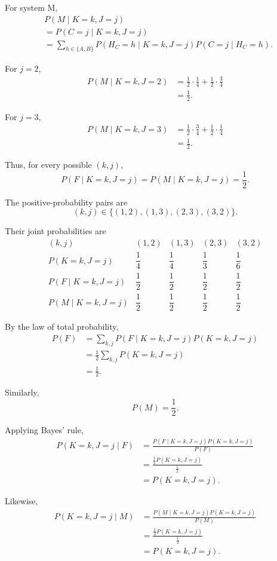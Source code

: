 \documentclass[11pt,a4paper]{article}
\newcommand{\Prob}{P}
\begin{document}
For system M,
\[
\begin{aligned}
&\Prob(M\mid K=k,J=j)\\
&=\Prob(C=j\mid K=k,J=j)\\
&=\sum_{h\in\{A,B\}}
\Prob(H_C=h\mid K=k,J=j)
\Prob(C=j\mid H_C=h).
\end{aligned}
\]

For $j=2$,
\[
\begin{aligned}
\Prob(M\mid K=k,J=2)
&=\frac12\cdot\frac14+
\frac12\cdot\frac34\\
&=\frac12.
\end{aligned}
\]

For $j=3$,
\[
\begin{aligned}
\Prob(M\mid K=k,J=3)
&=\frac12\cdot\frac34+
\frac12\cdot\frac14\\
&=\frac12.
\end{aligned}
\]

Thus, for every possible $(k,j)$,
\[
\Prob(F\mid K=k,J=j)
=
\Prob(M\mid K=k,J=j)
=
\frac12.
\]

The positive-probability pairs are
\[
(k,j)\in\{(1,2),(1,3),(2,3),(3,2)\}.
\]

Their joint probabilities are
\[
\begin{array}{c|cccc}
(k,j)&(1,2)&(1,3)&(2,3)&(3,2)\\
\hline
\Prob(K=k,J=j)
&\dfrac14&\dfrac14&\dfrac13&\dfrac16\\[6pt]
\Prob(F\mid K=k,J=j)
&\dfrac12&\dfrac12&\dfrac12&\dfrac12\\[6pt]
\Prob(M\mid K=k,J=j)
&\dfrac12&\dfrac12&\dfrac12&\dfrac12
\end{array}
\]

By the law of total probability,
\[
\begin{aligned}
\Prob(F)
&=\sum_{k,j}
\Prob(F\mid K=k,J=j)\Prob(K=k,J=j)\\
&=\frac12\sum_{k,j}\Prob(K=k,J=j)\\
&=\frac12.
\end{aligned}
\]

Similarly,
\[
\Prob(M)=\frac12.
\]

Applying Bayes' rule,
\[
\begin{aligned}
\Prob(K=k,J=j\mid F)
&=\frac{\Prob(F\mid K=k,J=j)
\Prob(K=k,J=j)}{\Prob(F)}\\
&=\frac{\frac12\Prob(K=k,J=j)}{\frac12}\\
&=\Prob(K=k,J=j).
\end{aligned}
\]

Likewise,
\[
\begin{aligned}
\Prob(K=k,J=j\mid M)
&=\frac{\Prob(M\mid K=k,J=j)
\Prob(K=k,J=j)}{\Prob(M)}\\
&=\frac{\frac12\Prob(K=k,J=j)}{\frac12}\\
&=\Prob(K=k,J=j).
\end{aligned}
\]
\end{document}
